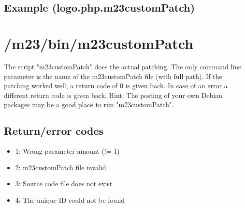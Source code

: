 \subsection{Example (logo.php.m23customPatch)}





\section{/m23/bin/m23customPatch}
The script "m23customPatch" does the actual patching. The only command line parameter is the name of the m23customPatch file (with full path). If the patching worked well, a return code of 0 is given back. In case of an error a different return code is given back. Hint: The posting of your own Debian packages may be a good place to run "m23customPatch".

\subsection{Return/error codes}

\begin{itemize}
	\item 1: Wrong parameter amount (!= 1)
	\item 2: m23customPatch file invalid
	\item 3: Source code file does not exist
	\item 4: The unique ID could not be found
\end{itemize}